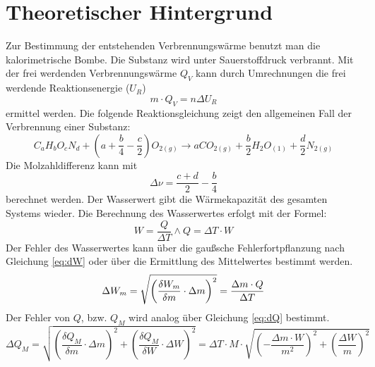 \section{Theoretischer Hintergrund}
	Zur Bestimmung der entstehenden Verbrennungswärme benutzt man die kalorimetrische Bombe. 
	Die Substanz wird unter Sauerstoffdruck verbrannt. 
	Mit der frei werdenden Verbrennungswärme $Q_V$ kann durch Umrechnungen die frei werdende Reaktionsenergie ($U_R$) 
	\begin{equation}
		m\cdot Q_V = n\Delta U_R
		\label{eq:UR}
	\end{equation}
	 ermittel werden.
	Die folgende Reaktionsgleichung zeigt den allgemeinen Fall der Verbrennung einer Substanz:
	\begin{equation}
	 	C_aH_bO_cN_d + \left( a + \frac{b}{4} - \frac{c}{2} \right) O_{2(g)} \rightarrow aCO_{2(g)} + \frac{b}{2} H_2O_{(1)} + \frac{d}{2} N_{2(g)} 
		\label{eq:rkt}
	\end{equation}
	 Die Molzahldifferenz kann mit 
	\begin{equation}
	 	\Delta \nu = \frac{c + d}{2} - \frac{b}{4}
		\label{eq:nu}
	\end{equation}  
	berechnet werden. 
	Der Wasserwert gibt  die Wärmekapazität des gesamten Systems wieder. 
	Die Berechnung des Wasserwertes erfolgt mit der Formel:
	\begin{equation}
		W = \frac{Q}{\Delta T}  \wedge Q = \Delta T \cdot W
		\label{eq:ww}
	\end{equation}
	Der Fehler des Wasserwertes kann über die gaußsche Fehlerfortpflanzung nach Gleichung \ref{eq:dW} oder über die Ermittlung des Mittelwertes bestimmt werden.
	\begin{equation}
		\Delta W_m = \sqrt{\left(\frac{\delta W_m}{\delta m}\cdot \Delta m\right)^2} = \frac{\Delta m \cdot Q}{\Delta T}\\	
		\label{eq:dW}
	\end{equation}
	Der Fehler von $Q$, bzw. $Q_M$ wird analog über Gleichung \ref{eq:dQ} bestimmt.
	\begin{equation}
		\Delta Q_M = \sqrt{\left( \frac{\delta Q_M}{\delta m}\cdot \Delta m \right)^2 + \left( \frac{\delta Q_M}{\delta W}\cdot \Delta W \right)^2}
     = \Delta T \cdot M \cdot \sqrt{\left( - \frac{\Delta m \cdot W}{m^2}\right)^2 + \left( \frac{\Delta W}{m}\right)^2}				
		\label{eq:dQ}
	\end{equation}

